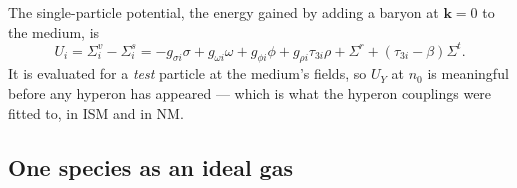\documentclass[aps,prc,onecolumn,superscriptaddress,nofootinbib,10pt]{revtex4-2}
\newcommand{\nzero}{n_0}
\newcommand{\Sigmar}{\Sigma^{r}}
\newcommand{\Sigmat}{\Sigma^{t}}
\begin{document}
The single-particle potential, the energy gained by adding a baryon at
$\mathbf{k} = 0$ to the medium, is
\begin{equation}
  U_i = \Sigma^v_i - \Sigma^s_i
      = -g_{\sigma i}\sigma + g_{\omega i}\omega + g_{\phi i}\phi
        + g_{\rho i}\tau_{3i}\rho + \Sigmar + (\tau_{3i} - \beta)\Sigmat .
  \label{eq:U}
\end{equation}
It is evaluated for a \emph{test} particle at the medium's fields, so $U_Y$ at
$\nzero$ is meaningful before any hyperon has appeared --- which is what the
hyperon couplings were fitted to, in ISM and in NM.

\subsection{One species as an ideal gas}
\label{sec:kinetics}
\end{document}
